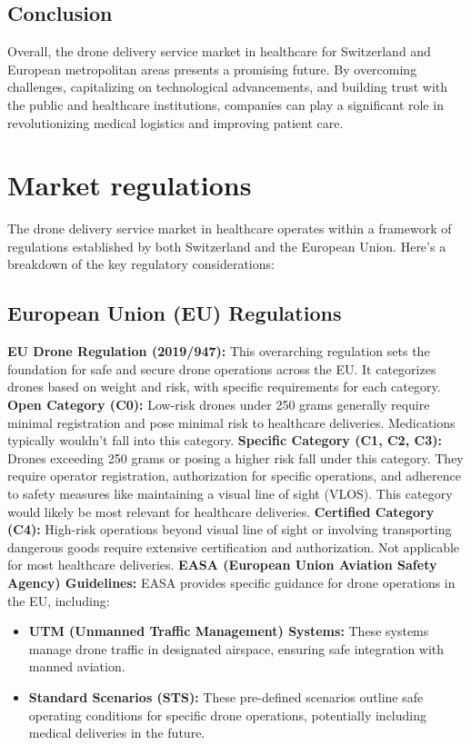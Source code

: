 \subsection{Conclusion}
Overall, the drone delivery service market in healthcare for Switzerland and European metropolitan areas presents a promising future. By overcoming challenges, capitalizing on technological advancements, and building trust with the public and healthcare institutions, companies can play a significant role in revolutionizing medical logistics and improving patient care.
\section{Market regulations}
The drone delivery service market in healthcare operates within a framework of regulations established by both Switzerland and the European Union. Here's a breakdown of the key regulatory considerations:
\subsection{European Union (EU) Regulations}
\textbf{EU Drone Regulation (2019/947):} This overarching regulation sets the foundation for safe and secure drone operations across the EU. It categorizes drones based on weight and risk, with specific requirements for each category. \cite{a2022_drones}
\newline
\textbf{Open Category (C0):} Low-risk drones under 250 grams generally require minimal registration and pose minimal risk to healthcare deliveries. Medications typically wouldn't fall into this category.
\newline
\textbf{Specific Category (C1, C2, C3):} Drones exceeding 250 grams or posing a higher risk fall under this category. They require operator registration, authorization for specific operations, and adherence to safety measures like maintaining a visual line of sight (VLOS). This category would likely be most relevant for healthcare deliveries.
\newline
\textbf{Certified Category (C4):} High-risk operations beyond visual line of sight or involving transporting dangerous goods require extensive certification and authorization. Not applicable for most healthcare deliveries.
\newline
\textbf{EASA (European Union Aviation Safety Agency) Guidelines:} EASA provides specific guidance for drone operations in the EU, including:
\begin{itemize}
  \item \textbf{UTM (Unmanned Traffic Management) Systems:} These systems manage drone traffic in designated airspace, ensuring safe integration with manned aviation.
  \item \textbf{Standard Scenarios (STS):} These pre-defined scenarios outline safe operating conditions for specific drone operations, potentially including medical deliveries in the future. \cite{a2022_drones}
\end{itemize}
